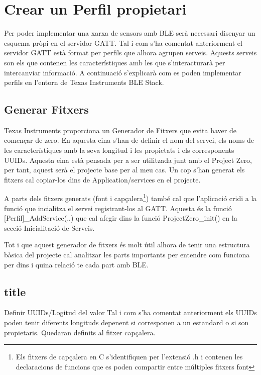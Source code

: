 \section{Crear un Perfil propietari}

Per poder implementar una xarxa de sensors amb BLE serà necessari disenyar un esquema pròpi en el servidor GATT.
Tal i com s'ha comentat anteriorment el servidor GATT està format per perfils que alhora agrupen serveis.
Aquests serveis son els que contenen les característiques amb les que s'interacturarà per intercanviar informació.
A continuació s'explicarà com es poden implementar perfils en l'entorn de Texas Instruments BLE Stack.

\subsection{Generar Fitxers}
Texas Instruments proporciona un Generador de Fitxers \cite{Service_Generator} que evita haver de començar de zero.
En aquesta eina s'han de definir el nom del servei, els noms de les característiques amb la seva longitud i les propietats i els corresponents UUIDs.
Aquesta eina està pensada per a ser utilitzada junt amb el Project Zero, per tant, aquest serà el projecte base per al meu cas.
Un cop s'han generat els fitxers cal copiar-los dins de Application/services en el projecte.

A parts dels fitxers generats (font i capçalera\footnote{Els fitxers de capçalera en C s'identifiquen per l'extensió .h i contenen les declaracions de funcions que es poden compartir entre múltiples fitxers font}) també cal que l'aplicació cridi a la funció que incialitza el servei registrant-los al GATT.
Aquesta és la funció [Perfil]\_AddService(..) que cal afegir dins la funció ProjectZero\_init() en la secció Inicialitació de Serveis.

Tot i que aquest generador de fitxers és molt útil alhora de tenir una estructura bàsica del projecte cal analitzar les parts importants per entendre com funciona per dins i quina relació te cada part amb BLE.

\subsection{title}

Definir UUIDs/Logitud del valor
Tal i com s'ha comentat anteriorment els UUIDs poden tenir diferents longituds depenent si corresponen a un estandard o si son propietaris.
Quedaran definits al fitxer capçalera.

